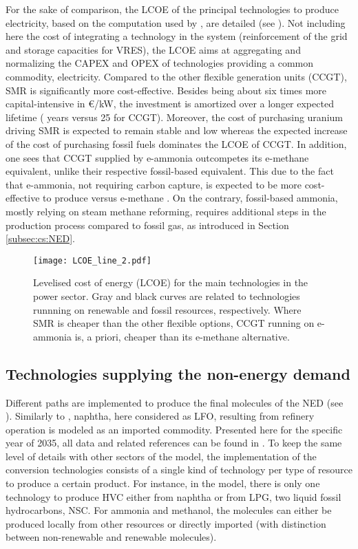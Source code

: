 For the sake of comparison, the \gls{LCOE} of the principal technologies to produce electricity, based on the computation used by \citet{limpens2021generating}, are detailed (see ). Not including here the cost of integrating a technology in the system (\eg reinforcement of the grid and storage capacities for \gls{VRES}), the \gls{LCOE} aims at aggregating and normalizing the CAPEX and OPEX of technologies providing a common commodity, \ie electricity. Compared to the other flexible generation units (\ie \gls{CCGT}), \gls{SMR} is significantly more cost-effective. Besides being about six times more capital-intensive in €/kW, the investment is amortized over a longer expected lifetime ( years versus 25 for \gls{CCGT}). Moreover, the cost of purchasing uranium driving \gls{SMR} is expected to remain stable and low whereas the expected increase of the cost of purchasing fossil fuels dominates the \gls{LCOE} of \gls{CCGT}. In addition, one sees that \gls{CCGT} supplied by e-ammonia outcompetes its e-methane equivalent, unlike their respective fossil-based equivalent. This due to the fact that e-ammonia, not requiring carbon capture, is expected to be more cost-effective to produce versus e-methane \cite{h2coalition}. On the contrary, fossil-based ammonia, mostly relying on steam methane reforming, requires additional steps in the production process compared to fossil gas, as introduced in Section \ref{subsec:cs:NED}.

\begin{figure}[htbp!]
\centering
\texttt{[image: LCOE\_line\_2.pdf]}
\caption{Levelised cost of energy (LCOE) for the main technologies in the power sector. Gray and black curves are related to technologies runnning on renewable and fossil resources, respectively. Where \gls{SMR} is cheaper than the other flexible options, \gls{CCGT} running on e-ammonia is, a priori, cheaper than its e-methane alternative.}
\label{fig:LCOE}
\end{figure}

\subsection{Technologies supplying the non-energy demand}
\label{subsec:cs:NED_tech}

Different paths are implemented to produce the final molecules of the NED (see ). Similarly to \citet{tsiropoulos2018emerging}, naphtha, here considered as \gls{LFO}, resulting from refinery operation is modeled as an imported commodity. Presented here for the specific year of 2035, all data and related references can be found in \cite{GIT_NED}. To keep the same level of details with other sectors of the model, the implementation of the conversion technologies consists of a single kind of technology per type of resource to produce a certain product. For instance, in the model, there is only one technology to produce \gls{HVC} either from naphtha or from LPG, two liquid fossil hydrocarbons, \ie \gls{NSC}. For ammonia and methanol, the molecules can either be produced locally from other resources or directly imported (with distinction between non-renewable and renewable molecules). 

